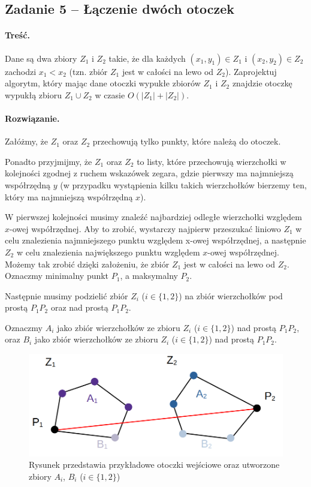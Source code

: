 \subsection{Zadanie 5 -- Łączenie dwóch otoczek}
\paragraph{Treść.} Dane są dwa zbiory $Z_1$ i $Z_2$ takie, że dla każdych $(x_1, y_1) \in Z_1$ i $(x_2, y_2) \in Z_2$ zachodzi $x_1 < x_2$ (tzn. zbiór $Z_1$ jest w całości na lewo od $Z_2$). Zaprojektuj algorytm, który mając dane otoczki wypukłe zbiorów $Z_1$ i $Z_2$
znajdzie otoczkę wypukłą zbioru $Z_1 \cup Z_2$ w czasie $O(|Z_1| + |Z_2|)$.

\paragraph{Rozwiązanie.} 
Załóżmy, że $Z_1$ oraz $Z_2$ przechowują tylko punkty, które należą do 
otoczek.

Ponadto przyjmijmy, że $Z_1$ oraz $Z_2$ to listy, które przechowują wierzchołki w kolejności zgodnej z ruchem wskazówek zegara, gdzie pierwszy ma najmniejszą współrzędną $y$ (w przypadku wystąpienia kilku takich wierzchołków bierzemy ten, który ma najmniejszą współrzędną $x$).

W pierwszej kolejności musimy znaleźć najbardziej odległe 
wierzchołki względem $x$-owej współrzędnej. Aby to zrobić, wystarczy
najpierw przeszukać liniowo $Z_1$ w celu znalezienia
najmniejszego punktu względem x-owej współrzędnej, a następnie $Z_2$ w celu znalezienia największego punktu względem $x$-owej współrzędnej. Możemy 
tak zrobić dzięki założeniu, że zbiór $Z_1$ jest w całości na lewo od $Z_2$. Oznaczmy minimalny punkt $P_1$, a maksymalny $P_2$.

Następnie musimy podzielić zbiór $Z_i$ ($i \in \{1, 2\}$) na 
zbiór wierzchołków pod prostą $P_1P_2$ oraz nad prostą $P_1P_2$.

Oznaczmy $A_i$ jako zbiór wierzchołków ze zbioru $Z_i$ ($i \in \{1, 2\}$) nad prostą $P_1P_2$, oraz $B_i$ jako zbiór wierzchołków ze zbioru $Z_i$ ($i \in \{1, 2\}$) nad prostą $P_1P_2$.

\begin{figure}[H]
	\centering
	\includegraphics[scale=0.5]{data/zad75.png}
	\caption{Rysunek przedstawia przykładowe otoczki wejściowe oraz utworzone zbiory $A_i$, $B_i$ ($i \in \{1, 2\}$)}
	\label{fig:laczenieotoczek}
\end{figure}

